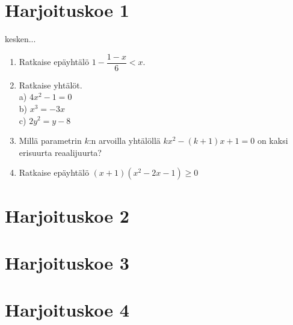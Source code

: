\section{Harjoituskoe 1}

kesken... 
\begin{enumerate}
\item Ratkaise epäyhtälö $1-\dfrac{1-x}{6}<x$.
\item Ratkaise yhtälöt. \\ a) $4x^2-1=0$ \\ b) $x^3=-3x$ \\ c) $2y^2=y-8$
\item Millä parametrin $k$:n arvoilla yhtälöllä $kx^2-(k+1)x+1=0$ on kaksi erisuurta reaalijuurta? 
\item Ratkaise epäyhtälö $(x+1)(x^2-2x-1)\geq0$

\end{enumerate}

\section{Harjoituskoe 2}


\section{Harjoituskoe 3}


\section{Harjoituskoe 4}
